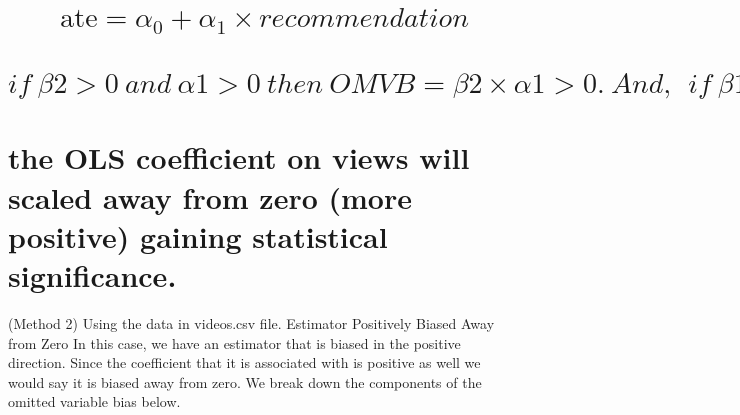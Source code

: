 \documentclass[
]{article}
\begin{document}
\hypertarget{text-ate-alpha_0-alpha_1-times-recommendation}{%
\section{\texorpdfstring{\[\text{ ate} =\alpha_0 + \alpha_1 \times recommendation  \]}{\textbackslash text\{ ate\} =\textbackslash alpha\_0 + \textbackslash alpha\_1 \textbackslash times recommendation  }}\label{text-ate-alpha_0-alpha_1-times-recommendation}}

\hypertarget{if-beta2-0-and-alpha1-0-then-omvb-beta2-times-alpha1-0-.-and-if-beta1-0}{%
\section{\texorpdfstring{\[if\  \beta2 > 0\  and\    \alpha1 > 0 \  then\ OMVB =   \beta2 \times \alpha1 > 0 . \ And,  \  \  if \  \beta1 > 0 \]}{if\textbackslash{}  \textbackslash beta2 \textgreater{} 0\textbackslash{}  and\textbackslash{}    \textbackslash alpha1 \textgreater{} 0 \textbackslash{}  then\textbackslash{} OMVB =   \textbackslash beta2 \textbackslash times \textbackslash alpha1 \textgreater{} 0 . \textbackslash{} And,  \textbackslash{}  \textbackslash{}  if \textbackslash{}  \textbackslash beta1 \textgreater{} 0 }}\label{if-beta2-0-and-alpha1-0-then-omvb-beta2-times-alpha1-0-.-and-if-beta1-0}}

\hypertarget{the-ols-coefficient-on-views-will-scaled-away-from-zero-more-positive-gaining-statistical-significance.}{%
\section{the OLS coefficient on views will scaled away from zero (more
positive) gaining statistical
significance.}\label{the-ols-coefficient-on-views-will-scaled-away-from-zero-more-positive-gaining-statistical-significance.}}

\newpage

(Method 2) Using the data in videos.csv file. Estimator Positively
Biased Away from Zero In this case, we have an estimator that is biased
in the positive direction. Since the coefficient that it is associated
with is positive as well we would say it is biased away from zero. We
break down the components of the omitted variable bias below.
\end{document}
